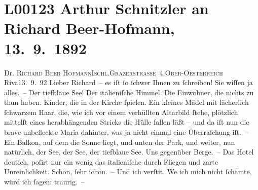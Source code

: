 

\section[Arthur Schnitzler an Richard Beer-Hofmann, 13. 9. 1892]{L00123 Arthur Schnitzler an Richard Beer-Hofmann, 13. 9. 1892}
\nopagebreak{}
\rehead{ }\normalsize\beginnumbering{}
\toendnotes[C]{\smallbreak\pagebreak[2]}
\toendnotes[C]{\smallbreak}\pstart{}{\pb}Dr. \textsc{Richard Beer Hofmann}\pend{}\pstart{}\textsc{Ischl.}\pend{}\pstart{}\textsc{Grazerstraße 4}.\pend{}\pstart{}\textsc{Ober-Oesterreich}\pend{}{\bigskip}\vspace{1em}
\pstart
           \raggedleft{}{\pb}Riva13. 9. 92\pend
           \vspace{0.5em}
\pstart
           Lieber Richard – es iſt ſo ſchwer Ihnen zu ſchreiben! Sie wiſſen ja
               alles. – Der tiefblaue See!
               Der italieniſche Himmel. Die Einwohner, die
               nichts zu thun haben. Kinder, die in der Kirche ſpielen. Ein kleines Mädel mit
               lächerlich ſchwarzem Haar, die, wie ich vor einem verhüllten Altarbild ſtehe,
               plötzlich mittelſt eines herabhängenden Stricks die Hülle fallen läßt – und da iſt
               nun die brave unbefleckte Maria dahinter, was ja nicht einmal eine Überraſchung
               iſt. – Ein Balkon, auf dem die Sonne liegt, und unten der Park, und weiter, nun
               natürlich, der See, der See,
               der tiefblaue See. Uns
               gegenüber Berge. – Das Hotel deutſch, poſirt nur ein wenig das italieniſche durch Fliegen und zarte Unreinlichkeit. Schön, ſehr
               ſchön. – Und ich verſti{\geminationm}t. We{\geminationn} ich mich nicht ſchämte, würd ich ſagen: traurig. –\pend
           
